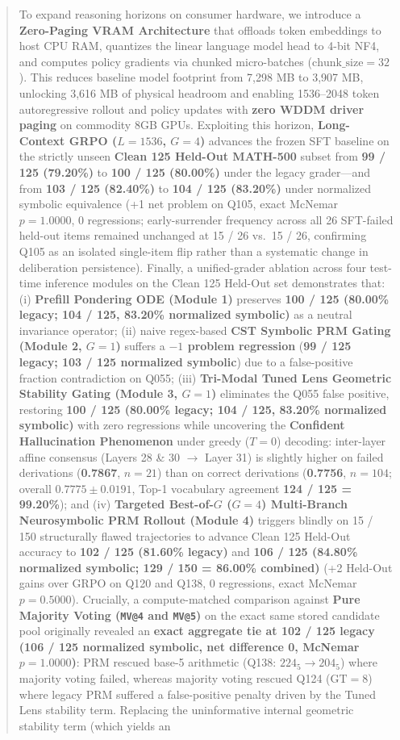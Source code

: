 \documentclass[11pt,a4paper]{article}
\begin{document}
\begin{abstract}
To expand reasoning horizons on consumer hardware, we introduce a \textbf{Zero-Paging VRAM Architecture} that offloads token embeddings to host CPU RAM, quantizes the linear language model head to 4-bit NF4, and computes policy gradients via chunked micro-batches ($\text{chunk\_size}=32$). This reduces baseline model footprint from 7,298 MB to 3,907 MB, unlocking 3,616 MB of physical headroom and enabling 1536--2048 token autoregressive rollout and policy updates with \textbf{zero WDDM driver paging} on commodity 8GB GPUs. Exploiting this horizon, \textbf{Long-Context GRPO ($L=1536$, $G=4$)} advances the frozen SFT baseline on the strictly unseen \textbf{Clean 125 Held-Out MATH-500} subset from \textbf{99 / 125 (79.20\%)} to \textbf{100 / 125 (80.00\%)} under the legacy grader---and from \textbf{103 / 125 (82.40\%)} to \textbf{104 / 125 (83.20\%)} under normalized symbolic equivalence (+1 net problem on Q105, exact McNemar $p = 1.0000$, 0 regressions; early-surrender frequency across all 26 SFT-failed held-out items remained unchanged at 15 / 26 vs.\ 15 / 26, confirming Q105 as an isolated single-item flip rather than a systematic change in deliberation persistence). Finally, a unified-grader ablation across four test-time inference modules on the Clean 125 Held-Out set demonstrates that: (i) \textbf{Prefill Pondering ODE (Module 1)} preserves \textbf{100 / 125 (80.00\% legacy; 104 / 125, 83.20\% normalized symbolic)} as a neutral invariance operator; (ii) naive regex-based \textbf{CST Symbolic PRM Gating (Module 2, $G=1$)} suffers a \textbf{$-1$ problem regression} (\textbf{99 / 125 legacy; 103 / 125 normalized symbolic}) due to a false-positive fraction contradiction on Q055; (iii) \textbf{Tri-Modal Tuned Lens Geometric Stability Gating (Module 3, $G=1$)} eliminates the Q055 false positive, restoring \textbf{100 / 125 (80.00\% legacy; 104 / 125, 83.20\% normalized symbolic)} with zero regressions while uncovering the \textbf{Confident Hallucination Phenomenon} under greedy ($T=0$) decoding: inter-layer affine consensus (Layers 28 \& 30 $\to$ Layer 31) is slightly higher on failed derivations (\textbf{0.7867}, $n=21$) than on correct derivations (\textbf{0.7756}, $n=104$; overall $0.7775 \pm 0.0191$, Top-1 vocabulary agreement \textbf{124 / 125 = 99.20\%}); and (iv) \textbf{Targeted Best-of-$G$ ($G=4$) Multi-Branch Neurosymbolic PRM Rollout (Module 4)} triggers blindly on 15 / 150 structurally flawed trajectories to advance Clean 125 Held-Out accuracy to \textbf{102 / 125 (81.60\% legacy)} and \textbf{106 / 125 (84.80\% normalized symbolic; 129 / 150 = 86.00\% combined)} (+2 Held-Out gains over GRPO on Q120 and Q138, 0 regressions, exact McNemar $p = 0.5000$). Crucially, a compute-matched comparison against \textbf{Pure Majority Voting (\texttt{MV@4} and \texttt{MV@5})} on the exact same stored candidate pool originally revealed an \textbf{exact aggregate tie at 102 / 125 legacy (106 / 125 normalized symbolic, net difference 0, McNemar $p = 1.0000$)}: PRM rescued base-5 arithmetic (Q138: $224_5 \to 204_5$) where majority voting failed, whereas majority voting rescued Q124 ($\text{GT} = 8$) where legacy PRM suffered a false-positive penalty driven by the Tuned Lens stability term. Replacing the uninformative internal geometric stability term (which yields an 
\end{abstract}
\end{document}
